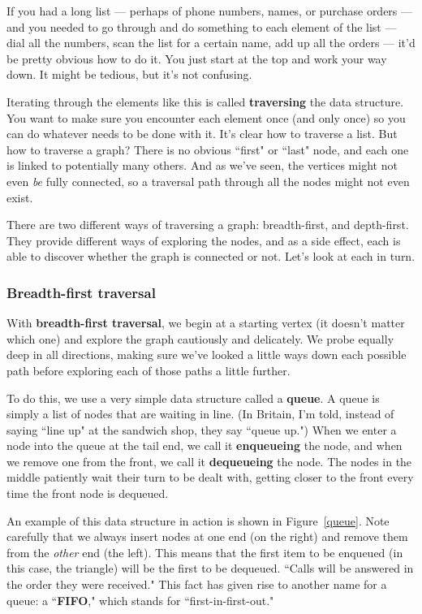 If you had a long list --- perhaps of phone numbers, names, or purchase
orders --- and you needed to go through and do something to each element of
the list --- dial all the numbers, scan the list for a certain name, add up
all the orders --- it'd be pretty obvious how to do it. You just start at
the top and work your way down. It might be tedious, but it's not
confusing.

Iterating through the elements like this is called \textbf{traversing} the
data structure. You want to make sure you encounter each element once (and
only once) so you can do whatever needs to be done with it. It's clear how
to traverse a list. But how to traverse a graph? There is no obvious
``first" or ``last" node, and each one is linked to potentially many
others. And as we've seen, the vertices might not even \textit{be} fully
connected, so a traversal path through all the nodes might not even exist.

There are two different ways of traversing a graph: breadth-first, and
depth-first. They provide different ways of exploring the nodes, and as a
side effect, each is able to discover whether the graph is connected or
not. Let's look at each in turn.

\subsubsection{Breadth-first traversal}

With \textbf{breadth-first traversal}, we begin at a starting vertex (it
doesn't matter which one) and explore the graph cautiously and delicately.
We probe equally deep in all directions, making sure we've looked a little
ways down each possible path before exploring each of those paths a little
further.

To do this, we use a very simple data structure called a \textbf{queue}. A
queue is simply a list of nodes that are waiting in line. (In Britain, I'm
told, instead of saying ``line up" at the sandwich shop, they say ``queue
up.") When we enter a node into the queue at the tail end, we call it
\textbf{enqueueing} the node, and when we remove one from the front, we
call it \textbf{dequeueing} the node. The nodes in the middle patiently
wait their turn to be dealt with, getting closer to the front every time
the front node is dequeued. 

An example of this data structure in action is shown in Figure~\ref{queue}.
Note carefully that we always insert nodes at one end (on the right) and
remove them from the \textit{other} end (the left). This means that the
first item to be enqueued (in this case, the triangle) will be the first to
be dequeued. ``Calls will be answered in the order they were received."
This fact has given rise to another name for a queue: a ``\textbf{FIFO},"
which stands for ``first-in-first-out."

